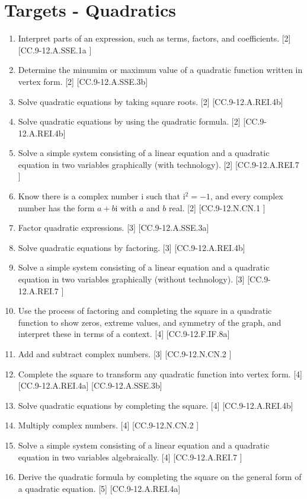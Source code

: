 \documentclass{article}
\begin{document}
\section{Targets - Quadratics}
\begin{enumerate}
	\item Interpret parts of an expression, such as terms, factors, and coefficients. [2] [CC.9-12.A.SSE.1a ]
	\item Determine the minumim or maximum value of a quadratic function written in vertex form. [2] [CC.9-12.A.SSE.3b]
	\item Solve quadratic equations by taking square roots. [2] [CC.9-12.A.REI.4b]
	\item Solve quadratic equations by using the quadratic formula. [2] [CC.9-12.A.REI.4b]
	\item Solve a simple system consisting of a linear equation and a quadratic equation in two variables graphically (with technology). [2] [CC.9-12.A.REI.7 ]
	\item Know there is a complex number i such that $\textrm{i}^2 =-1$, and every complex number has the form $a + b\textrm{i}$ with $a$ and $b$ real.	 [2] [CC.9-12.N.CN.1 ]
	\item Factor quadratic expressions. [3] [CC.9-12.A.SSE.3a] 
	\item Solve quadratic equations by factoring. [3] [CC.9-12.A.REI.4b]
	\item Solve a simple system consisting of a linear equation and a quadratic equation in two variables graphically (without technology). [3] [CC.9-12.A.REI.7 ] 
	\item Use the process of factoring and completing the square in a quadratic function to show zeros, extreme values, and symmetry of the graph, and interpret these in terms of a context. [4] [CC.9-12.F.IF.8a]
	\item Add and subtract complex numbers. [3] [CC.9-12.N.CN.2 ]
	\item Complete the square to transform any quadratic function into vertex form. [4] [CC.9-12.A.REI.4a] [CC.9-12.A.SSE.3b]
	\item Solve quadratic equations by completing the square. [4] [CC.9-12.A.REI.4b]
	\item Multiply complex numbers. [4] [CC.9-12.N.CN.2 ]
	\item Solve a simple system consisting of a linear equation and a quadratic equation in two variables algebraically. [4] [CC.9-12.A.REI.7 ]	
	\item Derive the quadratic formula by completing the square on the general form of a quadratic equation. [5] [CC.9-12.A.REI.4a]	
\end{enumerate}
\newpage
\end{document}
